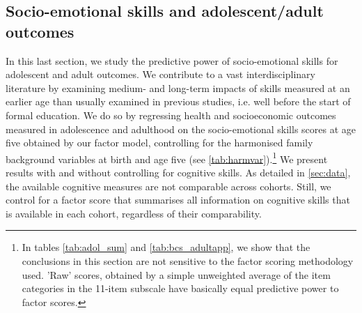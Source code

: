 \subsection{Socio-emotional skills and adolescent/adult outcomes}

In this last section, we study the predictive power of socio-emotional skills for adolescent and adult outcomes. We contribute to a vast interdisciplinary literature by examining medium- and long-term impacts of skills measured at an earlier age than usually examined in previous studies, i.e. well before the start of formal education. We do so by regressing health and socioeconomic outcomes measured in adolescence and adulthood on the socio-emotional skills scores at age five obtained by our factor model, controlling for the harmonised family background variables at birth and age five (see \autoref{tab:harmvar}).\footnote{In tables \ref{tab:adol_sum} and \ref{tab:bcs_adultapp}, we show that the conclusions in this section are not sensitive to the factor scoring methodology used. 'Raw' scores, obtained by a simple unweighted average of the item categories in the 11-item subscale have basically equal predictive power to factor scores.} We present results with and without controlling for cognitive skills. As detailed in \autoref{sec:data}, the available cognitive measures are not comparable across cohorts. Still, we control for a factor score that summarises all information on cognitive skills that is available in each cohort, regardless of their comparability.

